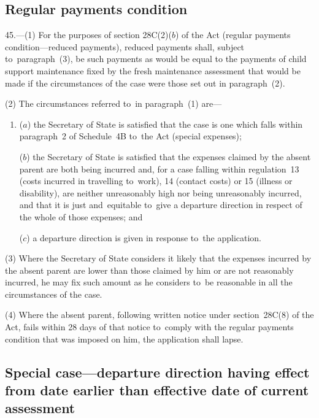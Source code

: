 \documentclass[12pt,a4paper]{article}
\begin{document}
\subsection[45. Regular payments condition]{Regular payments condition}

45.—(1) For the purposes of section
28C(2)($b$) of the Act (regular payments condition—reduced payments), reduced
payments shall, subject to~paragraph~(3), be such payments as would be equal to
the payments of child support maintenance fixed by the fresh maintenance
assessment that would be made if the circumstances of the case were those set
out in paragraph~(2).

(2) The circumstances referred to~in paragraph~(1) are—
\begin{enumerate}\item[]
($a$) the Secretary of State is satisfied that the case is one which falls within
paragraph~2 of Schedule~4B to~the Act (special expenses);

($b$) the Secretary of State is satisfied that the expenses claimed by the absent
parent are both being incurred and, for a case falling within regulation~13
(costs incurred in travelling to~work), 14 (contact costs) or 15 (illness or
disability), are neither unreasonably high nor being unreasonably incurred, and
that it is just and~equitable to~give a departure direction in respect of the
whole of those expenses; and

($c$) a departure direction is given in response to~the application.
\end{enumerate}

(3) Where the Secretary of State considers it likely that the expenses incurred
by the absent parent are lower than those claimed by him or are not reasonably
incurred, he may fix such amount as he considers to~be reasonable in all the
circumstances of the case.

(4) Where the absent parent, following written notice under section~28C(8) of
the Act, fails within 28 days of that notice to~comply with the regular payments
condition that was imposed on him, the application shall lapse.

\subsection[46. Special case—departure direction having effect from date earlier than effective
date of current assessment]{\sloppy Special case—departure direction having effect from date earlier than effective
date of current assessment}
\end{document}
